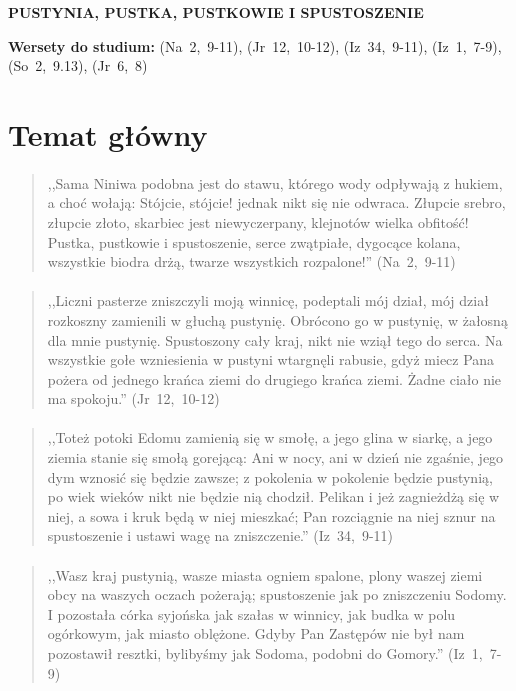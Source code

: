 \documentclass[10pt,a4paper,oneside]{article}
\begin{document}
\centerline{\textbf{\MakeUppercase{Pustynia, pustka, pustkowie i spustoszenie}}}
\begin{center}
\textbf{Wersety do studium:} \mbox{(Na 2, 9-11)}, \mbox{(Jr 12, 10-12)}, \mbox{(Iz 34, 9-11)}, \mbox{(Iz 1, 7-9)}, \mbox{(So 2, 9.13)}, \mbox{(Jr 6, 8)}
\end{center}
\section{Temat główny}
\paragraph{}
\begin{quote}
,,Sama Niniwa podobna jest do stawu, którego wody odpływają z hukiem, a choć wołają: Stójcie, stójcie! jednak nikt się nie odwraca. Złupcie srebro, złupcie złoto, skarbiec jest niewyczerpany, klejnotów wielka obfitość! Pustka, pustkowie i spustoszenie, serce zwątpiałe, dygocące kolana, wszystkie biodra drżą, twarze wszystkich rozpalone!'' \mbox{(Na 2, 9-11)}
\end{quote}
\paragraph{}
\begin{quote}
,,Liczni pasterze zniszczyli moją winnicę, podeptali mój dział, mój dział rozkoszny zamienili w głuchą pustynię. Obrócono go w pustynię, w żałosną dla mnie pustynię. Spustoszony cały kraj, nikt nie wziął tego do serca. Na wszystkie gołe wzniesienia w pustyni wtargnęli rabusie, gdyż miecz Pana pożera od jednego krańca ziemi do drugiego krańca ziemi. Żadne ciało nie ma spokoju.'' \mbox{(Jr 12, 10-12)}
\end{quote}
\paragraph{}
\begin{quote}
,,Toteż potoki Edomu zamienią się w smołę, a jego glina w siarkę, a jego ziemia stanie się smołą gorejącą: Ani w nocy, ani w dzień nie zgaśnie, jego dym wznosić się będzie zawsze; z pokolenia w pokolenie będzie pustynią, po wiek wieków nikt nie będzie nią chodził. Pelikan i jeż zagnieżdżą się w niej, a sowa i kruk będą w niej mieszkać; Pan rozciągnie na niej sznur na spustoszenie i ustawi wagę na zniszczenie.'' \mbox{(Iz 34, 9-11)}
\end{quote}
\paragraph{}
\begin{quote}
,,Wasz kraj pustynią, wasze miasta ogniem spalone, plony waszej ziemi obcy na waszych oczach pożerają; spustoszenie jak po zniszczeniu Sodomy. I pozostała córka syjońska jak szałas w winnicy, jak budka w polu ogórkowym, jak miasto oblężone. Gdyby Pan Zastępów nie był nam pozostawił resztki, bylibyśmy jak Sodoma, podobni do Gomory.'' \mbox{(Iz 1, 7-9)}
\end{quote}
\end{document}
